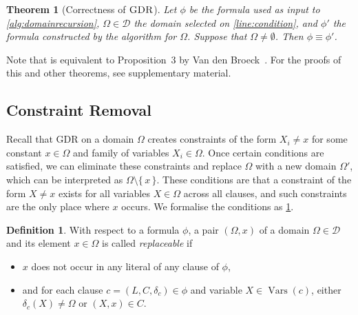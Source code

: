 \documentclass{article}
\newtheorem{theorem}{Theorem}
\theoremstyle{definition}
\newtheorem{definition}{Definition}
\theoremstyle{remark}
\DeclareMathOperator{\GDR}{\textsc{GDR}}
\DeclareMathOperator{\Vars}{Vars}
\begin{document}
\begin{theorem}[Correctness of $\GDR$]\label{thm:correctness1}
  Let $\phi$ be the formula used as input to \cref{alg:domainrecursion},
  $\Omega \in \mathcal{D}$ the domain selected on \cref{line:condition}, and
  $\phi'$ the formula constructed by the algorithm for $\Omega$. Suppose that
  $\Omega \ne \emptyset$. Then $\phi \equiv \phi'$.
\end{theorem}

Note that  is equivalent to Proposition~3 by Van den
Broeck~. For the proofs of this and other
theorems, see supplementary material.

\subsection{Constraint Removal}\label{sec:cr}

Recall that GDR on a domain $\Omega$ creates constraints of the form $X_i \ne x$
for some constant $x \in \Omega$ and family of variables $X_i \in \Omega$. Once
certain conditions are satisfied, we can eliminate these constraints and replace
$\Omega$ with a new domain $\Omega'$, which can be interpreted as
$\Omega \setminus \{\, x \,\}$. These conditions are that a constraint of the
form $X \ne x$ exists for all variables $X \in \Omega$ across all clauses, and
such constraints are the only place where $x$ occurs. We formalise the
conditions as \cref{def:replaceable}.

\begin{definition}\label{def:replaceable}
  With respect to a formula $\phi$, a pair $(\Omega, x)$ of a domain
  $\Omega \in \mathcal{D}$ and its element $x \in \Omega$ is called
  \emph{replaceable} if
  \begin{itemize}
    \item $x$ does not occur in any literal of any clause of $\phi$,
    \item and for each clause $c = (L, C, \delta_c) \in \phi$ and variable
          $X \in \Vars(c)$, either $\delta_c(X) \ne \Omega$ or $(X, x) \in C$.
  \end{itemize}
\end{definition}
\end{document}
